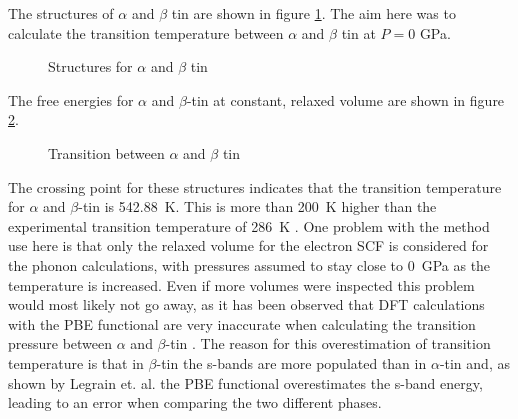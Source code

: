 \documentclass[12pt]{article}
\begin{document}
The structures of $\alpha$ and $\beta$ tin are shown in figure \ref{fig:alpha_and_beta_tin}. The aim here was to calculate the transition temperature between $\alpha$ and $\beta$ tin at $P=0$ GPa.
\begin{figure}
	\centering
	\qquad
	\qquad
	\caption{Structures for $\alpha$ and $\beta$ tin}
	\label{fig:alpha_and_beta_tin}
\end{figure}

The free energies for $\alpha$ and $\beta$-tin at constant, relaxed volume are shown in figure \ref{fig:sn_transition}.

\begin{figure}
	\centering
	
	\caption{Transition between $\alpha$ and $\beta$ tin}
	\label{fig:sn_transition}
\end{figure}

The crossing point for these structures indicates that the transition temperature for $\alpha$ and $\beta$-tin is \SI{542.88}{\kelvin}. This is more than \SI{200}{\kelvin} higher than the experimental transition temperature of \SI{286}{\kelvin} \cite{Raynor101}. 
One problem with the method use here is that only the relaxed volume for the electron SCF is considered for the phonon calculations, with pressures assumed to stay close to \SI{0}{\giga\pascal} as the temperature is increased.
Even if more volumes were inspected this problem would most likely not go away, as it has been observed that DFT calculations with the PBE functional are very inaccurate when calculating the transition pressure between $\alpha$ and $\beta$-tin \cite{legrain2016understanding}. The reason for this overestimation of transition temperature is that in $\beta$-tin the s-bands are more populated than in $\alpha$-tin and, as shown by Legrain et. al. the PBE functional overestimates the s-band energy, leading to an error when comparing the two different phases.
\end{document}

